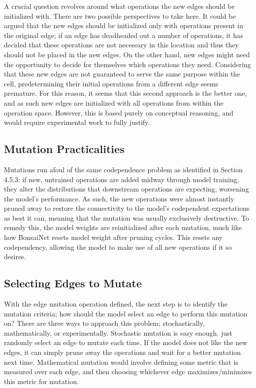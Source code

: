 A crucial question revolves around what operations the new edges should be initialized with. There are two possible
perspectives to take here. It could be argued that the new edges should be initialized only with operations present
in the original edge; if an edge has deadheaded out a number of operations, it has decided that these operations are
not necessary in this location and thus they should not be placed in the new edges. On the other hand,
new edges might need the opportunity to decide for themselves which operations they need. Considering
that these new edges are not guaranteed to serve the same purpose within the cell, predetermining their initial
operations from a different edge seems premature. For this reason, it seems that this second approach is the better one,
and as such new edges are initialized with all operations from within the operation space. However, this
is based purely on conceptual reasoning, and would require experimental work to fully justify.

\subsection{Mutation Practicalities}\label{sect:spider_mutation_reinit}
Mutations run afoul of the same codependence problem as identified in Section 4.5.3: if new, untrained operations are added
midway through model training, they alter the distributions that downstream operations
are expecting, worsening the model's performance. As such, the new operations were almost
instantly pruned away to restore the connectivity to the model's codependent expectations as best it can,
meaning that the mutation was usually exclusively destructive. To remedy this, the model weights are reinitialized
after each mutation, much like how BonsaiNet resets model weight after pruning cycles. This resets any codependency,
allowing the model to make use of all new operations if it so desires.

\subsection{Selecting Edges to Mutate}
With the edge mutation operation defined, the next step is to identify the mutation criteria; how should the model
select an edge to perform this mutation on? There are three ways to approach this problem; stochastically,
mathematically, or experimentally. Stochastic mutation is easy enough, just randomly select an edge to mutate each time.
If the model does not like the new edges, it can simply prune away the operations and wait for a better mutation next time.
Mathematical mutation would involve defining some metric that is measured over each edge, and then choosing
whichever edge maximizes/minimizes this metric for mutation.

